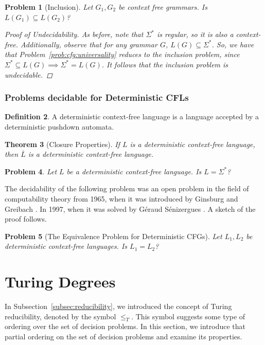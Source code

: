 \documentclass[psamsfonts]{amsart}
\newtheorem{thm}{Theorem}[section]
\newtheorem{prob}[thm]{Problem}
\theoremstyle{definition}
\newtheorem{defn}[thm]{Definition}
\theoremstyle{remark}
\numberwithin{equation}{section}
\begin{document}
\begin{prob}[Inclusion]
  Let $G_1,G_2$ be context free grammars. Is $L(G_1)\subseteq L(G_2)$?
  \begin{proof}[Proof of Undecidability]
    As before, note that $\Sigma^*$ is regular, so it is also a
    context-free. Additionally, observe that for any grammar $G$, $L(G)\subseteq
    \Sigma^*$. So,
    we have that Problem~\ref{prob:cfg:universality} reduces to the inclusion
    problem, since $\Sigma^* \subseteq L(G) \implies \Sigma^* = L(G)$. It follows that the inclusion problem is undecidable.
  \end{proof}
\end{prob}

\subsubsection{Problems decidable for Deterministic CFLs}
\cite{ginsburg65:_deter}
\begin{defn}
  A deterministic context-free language is a language accepted by a
  deterministic pushdown automata.
\end{defn}

\begin{thm}[Closure Properties]
  If $L$ is a deterministic context-free language, then $\overline{L}$ is a
  deterministic context-free language.
\end{thm}

\begin{prob}
  Let $L$ be a deterministic context-free language. Is $L = \Sigma^*$?
\end{prob}

The decidability of the following problem was an open problem in the field of
computability theory from 1965, when it was introduced by Ginsburg and Greibach \cite{ginsburg65:_deter}. In 1997, when it was solved by G\'eraud S\'enizergues
\cite{senizergues_det_pd_decid}. A sketch of the proof follows. 

\begin{prob}[The Equivalence Problem for Deterministic CFGs]
  Let $L_1,L_2$ be deterministic context-free languages. Is $L_1=L_2$?

\end{prob}

\section{Turing Degrees}
In Subsection~\ref{subsec:reducibility}, we introduced the concept of
Turing reducibility, denoted by the symbol $\leq_T$. This symbol suggests some type of
ordering over the set of decision problems. In this section, we introduce that
partial ordering on the set of decision problems and examine its properties.
\end{document}
